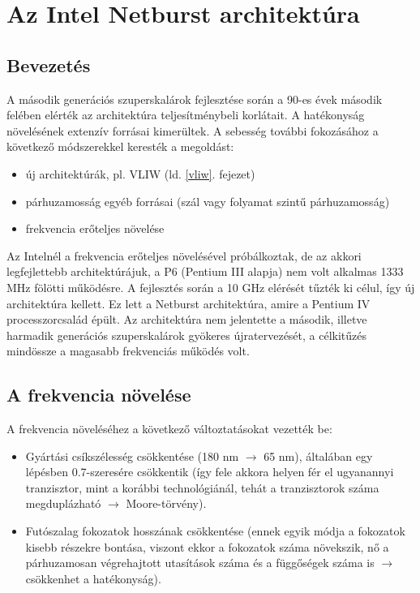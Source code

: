 
\chapter{Az Intel Netburst architektúra}

\section{Bevezetés}
A második generációs szuperskalárok fejlesztése során a 90-es évek második felében elérték az architektúra teljesítménybeli korlátait.
A hatékonyság növelésének extenzív forrásai kimerültek.
A sebesség további fokozásához a következő módszerekkel keresték a megoldást:
\begin{itemize}
    \item új architektúrák, pl. VLIW (ld. \ref{vliw}. fejezet)
    \item párhuzamosság egyéb forrásai (szál vagy folyamat szintű párhuzamosság)
    \item frekvencia erőteljes növelése
\end{itemize}
Az Intelnél a frekvencia erőteljes növelésével próbálkoztak, de az akkori legfejlettebb architektúrájuk, a P6 (Pentium III alapja) nem volt alkalmas 1333 MHz fölötti működésre.
A fejlesztés során a 10 GHz elérését tűzték ki célul, így új architektúra kellett.
Ez lett a Netburst architektúra, amire a Pentium IV processzorcsalád épült.
Az architektúra nem jelentette a második, illetve harmadik generációs szuperskalárok gyökeres újratervezését, a célkitűzés mindössze a magasabb frekvenciás működés volt.

\section{A frekvencia növelése}
A frekvencia növeléséhez a következő változtatásokat vezették be:
\begin{itemize}
    \item Gyártási csíkszélesség csökkentése (180 nm $\rightarrow$ 65 nm), általában egy lépésben 0.7-szeresére csökkentik (így fele akkora helyen fér el ugyanannyi tranzisztor, mint a korábbi technológiánál, tehát a tranzisztorok száma megduplázható $\rightarrow$ Moore-törvény).
    \item Futószalag fokozatok hosszának csökkentése (ennek egyik módja a fokozatok kisebb részekre bontása, viszont ekkor a fokozatok száma növekszik, nő a párhuzamosan végrehajtott utasítások száma és a függőségek száma is $\rightarrow$ csökkenhet a hatékonyság).
\end{itemize}

